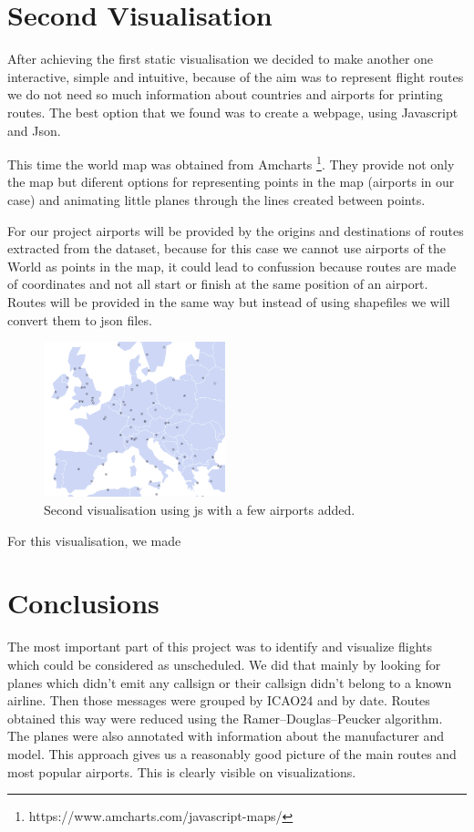 \documentclass{vldb}
\begin{document}
\section{Second Visualisation}
After achieving the first static visualisation we decided to make 
another one interactive, simple and intuitive, because of the aim was to 
represent flight routes we do not need so much information 
about countries and airports for printing routes. 
The best option that we found was to create a webpage, using Javascript and Json. 

This time the world map was obtained from 
Amcharts \footnote{https://www.amcharts.com/javascript-maps/}. 
They provide not only the map but diferent options for representing 
points in the map (airports in our case) and animating 
little planes through the lines created between points. 

For our project airports will be provided by the origins and 
destinations of routes extracted from the dataset, because 
for this case we cannot use airports of the World as points in the map, it could lead to confussion
because routes are made of coordinates and not all start or finish at the same position of an airport. 
Routes will be provided in the same way but instead of using shapefiles we will convert them to json files.

\begin{figure}
\centering
\includegraphics[width=0.47\textwidth]{js_Europe_center_few_airports}
\caption{Second visualisation using js with a few airports added.}
\label{fig:js_Europe_center_few_airportsi}
\end{figure}

For this visualisation, we made 


\section{Conclusions}
The most important part of this project was to identify 
and visualize flights which could be considered as unscheduled. 
We did that mainly by looking for planes which didn’t emit any 
callsign or their callsign didn’t belong to a known airline. 
Then those messages were grouped by ICAO24 and by date. 
Routes obtained this way were reduced using the Ramer–Douglas–Peucker algorithm. 
The planes were also annotated with information 
about the manufacturer and model. 
This approach gives us a reasonably good picture of the main routes and most popular airports. 
This is clearly visible on visualizations.
\end{document}
